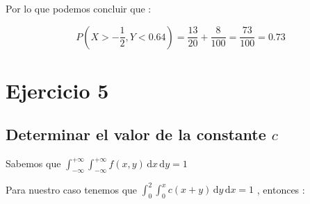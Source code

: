\documentclass[12pt]{article}
\begin{document}
    \begin{flushleft}
        Por lo que podemos concluir que : 
    \end{flushleft}

    \begin{equation*}
        P\left(X> - \frac{1}{2} , Y < 0.64\right) = \frac{13}{20} + \frac{8}{100} = \frac{73}{100} = 0.73
    \end{equation*}


    \vspace{2cm} 
    \section*{Ejercicio 5 }

    \subsection*{Determinar el valor de la constante $c$}

    \begin{flushleft}
        Sabemos que $ \displaystyle \int_{-\infty}^{+\infty} \int_{-\infty}^{+\infty} f\left(x,y\right) \,\mathrm{d}x  \,\mathrm{d}y   =1 $
    \end{flushleft}

    \begin{flushleft}
        Para nuestro caso tenemos que $\displaystyle \int_{0}^{2} \int_{0}^{x} c\left(x+y \right) \,\mathrm{d}y \,\mathrm{d}x   =1 $ , entonces : 
    \end{flushleft}
\end{document}
